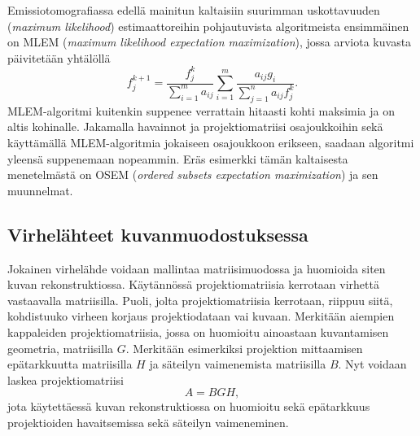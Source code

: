 Emissiotomografiassa edellä mainitun kaltaisiin suurimman uskottavuuden (\textit{maximum likelihood}) estimaattoreihin pohjautuvista algoritmeista ensimmäinen on MLEM (\textit{maximum likelihood expectation maximization}), jossa arviota kuvasta päivitetään yhtälöllä\cite{boudjelal_novel_2021, shepp_maximum_1982, wettenhovi_omegaopen-source_2021, bruyant_analytic_2002, wettenhovi_transmission_2021}
\begin{equation*}
    f_j^{k+1}=\frac{f_j^{k}}{\sum_{i=1}^{m}a_{ij}}\sum_{i=1}^{m}\frac{a_{ij}g_i}{\sum_{j=1}^{n}a_{ij}f_j^{k}}.
\end{equation*}
MLEM-algoritmi kuitenkin suppenee verrattain hitaasti kohti maksimia ja on altis kohinalle\cite{wettenhovi_omegaopen-source_2021, bruyant_analytic_2002}. Jakamalla havainnot ja projektiomatriisi osajoukkoihin sekä käyttämällä MLEM-algoritmia jokaiseen osajoukkoon erikseen, saadaan algoritmi yleensä suppenemaan nopeammin. Eräs esimerkki tämän kaltaisesta menetelmästä on OSEM (\textit{ordered subsets expectation maximization}) ja sen muunnelmat.\cite{bruyant_analytic_2002, wettenhovi_omegaopen-source_2021, beister_iterative_2012}

\subsection{Virhelähteet kuvanmuodostuksessa}
Jokainen virhelähde voidaan mallintaa matriisimuodossa ja huomioida siten kuvan rekonstruktiossa. Käytännössä projektiomatriisia kerrotaan virhettä vastaavalla matriisilla. Puoli, jolta projektiomatriisia kerrotaan, riippuu siitä, kohdistuuko virheen korjaus projektiodataan vai kuvaan. Merkitään aiempien kappaleiden projektiomatriisia, jossa on huomioitu ainoastaan kuvantamisen geometria, matriisilla $G$. Merkitään esimerkiksi projektion mittaamisen epätarkkuutta matriisilla $H$ ja säteilyn vaimenemista matriisilla $B$. Nyt voidaan laskea projektiomatriisi
\begin{equation*}
    A=BGH,
\end{equation*}
jota käytettäessä kuvan rekonstruktiossa on huomioitu sekä epätarkkuus projektioiden havaitsemissa sekä säteilyn vaimeneminen\cite{wettenhovi_omegaopen-source_2021}.

